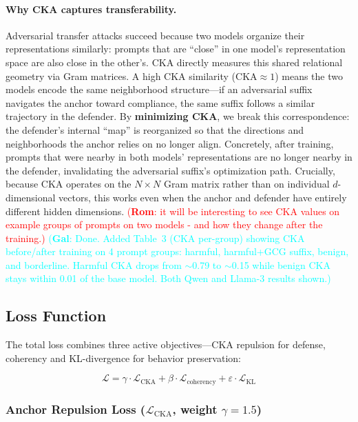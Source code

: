 \documentclass[11pt]{article}
\newcommand\rom[1]{\textcolor{red}{(\textbf{Rom}: #1)}} %
\newcommand\gal[1]{\textcolor{cyan}{(\textbf{Gal}: #1)}} %
\newcommand{\loss}{\mathcal{L}}
\begin{document}
\paragraph{Why CKA captures transferability.}
Adversarial transfer attacks succeed because two models organize their representations similarly: prompts that are ``close'' in one model's representation space are also close in the other's. CKA directly measures this shared relational geometry via Gram matrices. A high CKA similarity ($\text{CKA} \approx 1$) means the two models encode the same neighborhood structure---if an adversarial suffix navigates the anchor toward compliance, the same suffix follows a similar trajectory in the defender. By \textbf{minimizing CKA}, we break this correspondence: the defender's internal ``map'' is reorganized so that the directions and neighborhoods the anchor relies on no longer align. Concretely, after training, prompts that were nearby in both models' representations are no longer nearby in the defender, invalidating the adversarial suffix's optimization path. Crucially, because CKA operates on the $N \times N$ Gram matrix rather than on individual $d$-dimensional vectors, this works even when the anchor and defender have entirely different hidden dimensions. \rom{it will be interesting to see CKA values on example groups of prompts on two models - and how they change after the training.} \gal{Done. Added Table~3 (CKA per-group) showing CKA before/after training on 4 prompt groups: harmful, harmful+GCG suffix, benign, and borderline. Harmful CKA drops from $\sim$0.79 to $\sim$0.15 while benign CKA stays within 0.01 of the base model. Both Qwen and Llama-3 results shown.}

\subsection{Loss Function}

The total loss combines three active objectives---CKA repulsion for defense, coherency and KL-divergence for behavior preservation:

\begin{equation}
    \loss = \gamma \cdot \loss_{\text{CKA}} + \beta \cdot \loss_{\text{coherency}} + \varepsilon \cdot \loss_{\text{KL}}
\end{equation}

\subsubsection{Anchor Repulsion Loss ($\loss_{\text{CKA}}$, weight $\gamma = 1.5$)}
\end{document}
